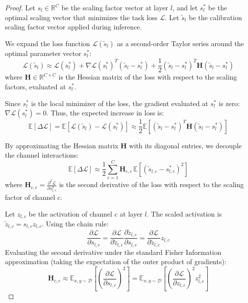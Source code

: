 \documentclass{article}
\theoremstyle{plain}
\theoremstyle{definition}
\theoremstyle{remark}
\begin{document}
\begin{proof}
Let $s_{l} \in \mathbb{R}^C$ be the scaling factor vector at layer $l$, and let $s^*_l$ be the optimal scaling vector that minimizes the task loss $\mathcal{L}$. Let $\tilde{s}_l$ be the calibration scaling factor vector applied during inference.

We expand the loss function $\mathcal{L}(\tilde{s}_l)$ as a second-order Taylor series around the optimal parameter vector $s^*_l$:
\begin{equation}
    \mathcal{L}(\tilde{s}_l) \approx \mathcal{L}(s^*_l) + \nabla \mathcal{L}(s^*_l)^T (\tilde{s}_l - s^*_l) + \frac{1}{2} (\tilde{s}_l - s^*_l)^T \mathbf{H} (\tilde{s}_l - s^*_l)
\end{equation}
where $\mathbf{H} \in \mathbb{R}^{C \times C}$ is the Hessian matrix of the loss with respect to the scaling factors, evaluated at $s^*_l$.

Since $s^*_l$ is the local minimizer of the loss, the gradient evaluated at $s^*_l$ is zero: $\nabla \mathcal{L}(s^*_l) = 0$. Thus, the expected increase in loss is:
\begin{equation}
    \mathbb{E}[\Delta \mathcal{L}] = \mathbb{E}[\mathcal{L}(\tilde{s}_l) - \mathcal{L}(s^*_l)] \approx \frac{1}{2} \mathbb{E}\left[ (\tilde{s}_l - s^*_l)^T \mathbf{H} (\tilde{s}_l - s^*_l) \right]
\end{equation}

By approximating the Hessian matrix $\mathbf{H}$ with its diagonal entries, we decouple the channel interactions:
\begin{equation}
    \mathbb{E}[\Delta \mathcal{L}] \approx \frac{1}{2} \sum_{c=1}^C \mathbf{H}_{c,c} \, \mathbb{E}\left[ (\tilde{s}_{l,c} - s^*_{l,c})^2 \right]
\end{equation}
where $\mathbf{H}_{c,c} = \frac{\partial^2 \mathcal{L}}{\partial s_{l,c}^2}$ is the second derivative of the loss with respect to the scaling factor of channel $c$.

Let $z_{l,c}$ be the activation of channel $c$ at layer $l$. The scaled activation is $\tilde{z}_{l,c} = s_{l,c} z_{l,c}$. Using the chain rule:
\begin{equation}
    \frac{\partial \mathcal{L}}{\partial s_{l,c}} = \frac{\partial \mathcal{L}}{\partial \tilde{z}_{l,c}} \frac{\partial \tilde{z}_{l,c}}{\partial s_{l,c}} = \frac{\partial \mathcal{L}}{\partial \tilde{z}_{l,c}} z_{l,c}
\end{equation}
Evaluating the second derivative under the standard Fisher Information approximation (taking the expectation of the outer product of gradients):
\begin{equation}
    \mathbf{H}_{c,c} \approx \mathbb{E}_{x,y \sim \mathcal{D}} \left[ \left( \frac{\partial \mathcal{L}}{\partial s_{l,c}} \right)^2 \right] = \mathbb{E}_{x,y \sim \mathcal{D}} \left[ \left( \frac{\partial \mathcal{L}}{\partial z_{l,c}} \right)^2 z_{l,c}^2 \right]
\end{equation}


\end{proof}
\end{document}
